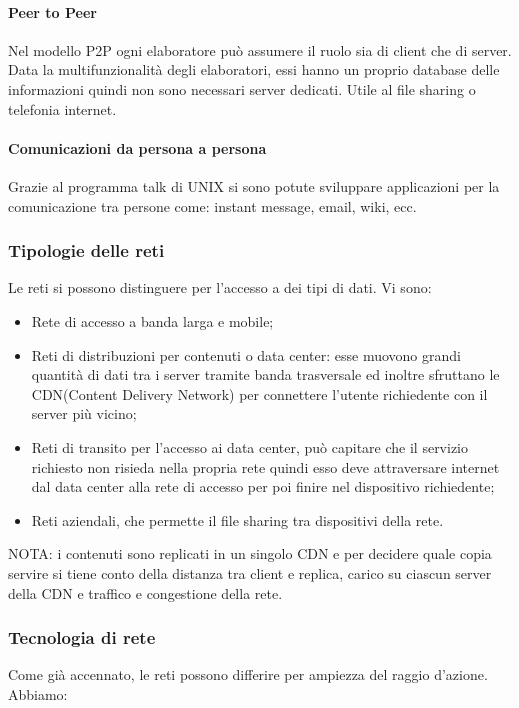 \documentclass{subfiles}
\begin{document}
    \paragraph{Peer to Peer}
    Nel modello P2P ogni elaboratore può assumere il ruolo sia di client che di server. Data la multifunzionalità degli elaboratori, 
    essi hanno un proprio database delle informazioni quindi non sono necessari server dedicati. Utile al file sharing o telefonia 
    internet.

    \paragraph{Comunicazioni da persona a persona}
    Grazie al programma talk di UNIX si sono potute sviluppare applicazioni per la comunicazione tra persone come: instant message, 
    email, wiki, ecc.

\subsubsection{Tipologie delle reti}
    Le reti si possono distinguere per l'accesso a dei tipi di dati. Vi sono:
    \begin{itemize}
        \item Rete di accesso a banda larga e mobile;
        \item Reti di distribuzioni per contenuti o data center: esse muovono grandi quantità di dati tra i server tramite banda 
        trasversale ed inoltre sfruttano le CDN(Content Delivery Network) per connettere l'utente richiedente con il server più vicino;
        \item Reti di transito per l'accesso ai data center, può capitare che il servizio richiesto non risieda nella propria rete 
        quindi esso deve attraversare internet dal data center alla rete di accesso per poi finire nel dispositivo richiedente;
        \item Reti aziendali, che permette il file sharing tra dispositivi della rete.
    \end{itemize}
    NOTA: i contenuti sono replicati in un singolo CDN e per decidere quale copia 
    servire si tiene conto della distanza tra client e replica, carico su ciascun server 
    della CDN e traffico e congestione della rete.

\subsubsection{Tecnologia di rete}
    Come già accennato, le reti possono differire per ampiezza del raggio d'azione. Abbiamo:
\end{document}
